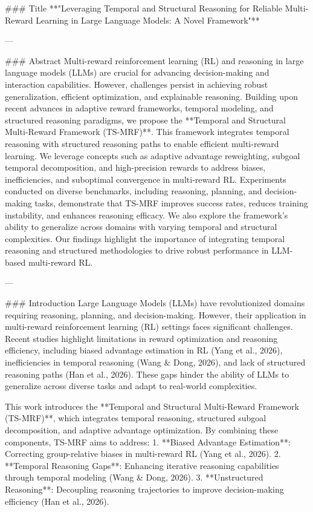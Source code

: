 ### Title 
**"Leveraging Temporal and Structural Reasoning for Reliable Multi-Reward Learning in Large Language Models: A Novel Framework"**

---

### Abstract
Multi-reward reinforcement learning (RL) and reasoning in large language models (LLMs) are crucial for advancing decision-making and interaction capabilities. However, challenges persist in achieving robust generalization, efficient optimization, and explainable reasoning. Building upon recent advances in adaptive reward frameworks, temporal modeling, and structured reasoning paradigms, we propose the **Temporal and Structural Multi-Reward Framework (TS-MRF)**. This framework integrates temporal reasoning with structured reasoning paths to enable efficient multi-reward learning. We leverage concepts such as adaptive advantage reweighting, subgoal temporal decomposition, and high-precision rewards to address biases, inefficiencies, and suboptimal convergence in multi-reward RL. Experiments conducted on diverse benchmarks, including reasoning, planning, and decision-making tasks, demonstrate that TS-MRF improves success rates, reduces training instability, and enhances reasoning efficacy. We also explore the framework’s ability to generalize across domains with varying temporal and structural complexities. Our findings highlight the importance of integrating temporal reasoning and structured methodologies to drive robust performance in LLM-based multi-reward RL.

---

### Introduction
Large Language Models (LLMs) have revolutionized domains requiring reasoning, planning, and decision-making. However, their application in multi-reward reinforcement learning (RL) settings faces significant challenges. Recent studies highlight limitations in reward optimization and reasoning efficiency, including biased advantage estimation in RL (Yang et al., 2026), inefficiencies in temporal reasoning (Wang & Dong, 2026), and lack of structured reasoning paths (Han et al., 2026). These gaps hinder the ability of LLMs to generalize across diverse tasks and adapt to real-world complexities.

This work introduces the **Temporal and Structural Multi-Reward Framework (TS-MRF)**, which integrates temporal reasoning, structured subgoal decomposition, and adaptive advantage optimization. By combining these components, TS-MRF aims to address:
1. **Biased Advantage Estimation**: Correcting group-relative biases in multi-reward RL (Yang et al., 2026).
2. **Temporal Reasoning Gaps**: Enhancing iterative reasoning capabilities through temporal modeling (Wang & Dong, 2026).
3. **Unstructured Reasoning**: Decoupling reasoning trajectories to improve decision-making efficiency (Han et al., 2026).

